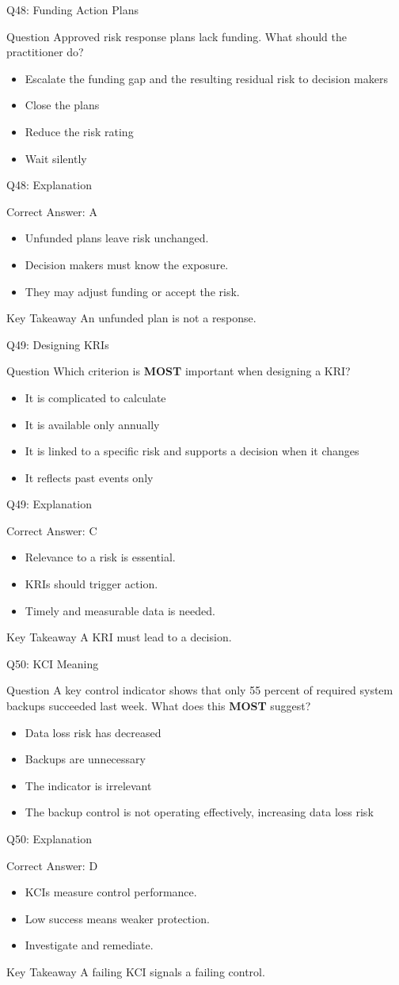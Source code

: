 \documentclass[aspectratio=169]{beamer}
\newcommand{\hq}[7]{%
	\begin{frame}{Q#1: #2}
		\begin{block}{Question}
			#3
		\end{block}
		\begin{itemize}
			#4
		\end{itemize}
	\end{frame}
	\begin{frame}{Q#1: Explanation}
		\begin{block}{Correct Answer: #5}
			\begin{itemize}
				#6
			\end{itemize}
		\end{block}
		\begin{alertblock}{Key Takeaway}
			#7
		\end{alertblock}
	\end{frame}
}
\begin{document}
	\hq{48}{Funding Action Plans}
	{Approved risk response plans lack funding. What should the practitioner do?}
	{\item[\textbf{(A)}] Escalate the funding gap and the resulting residual risk to decision makers
		\item[\textbf{(B)}] Close the plans
		\item[\textbf{(C)}] Reduce the risk rating
		\item[\textbf{(D)}] Wait silently}
	{A}
	{\item Unfunded plans leave risk unchanged.
		\item Decision makers must know the exposure.
		\item They may adjust funding or accept the risk.}
	{An unfunded plan is not a response.}
	
	\hq{49}{Designing KRIs}
	{Which criterion is \textbf{MOST} important when designing a KRI?}
	{\item[\textbf{(A)}] It is complicated to calculate
		\item[\textbf{(B)}] It is available only annually
		\item[\textbf{(C)}] It is linked to a specific risk and supports a decision when it changes
		\item[\textbf{(D)}] It reflects past events only}
	{C}
	{\item Relevance to a risk is essential.
		\item KRIs should trigger action.
		\item Timely and measurable data is needed.}
	{A KRI must lead to a decision.}
	
	\hq{50}{KCI Meaning}
	{A key control indicator shows that only 55 percent of required system backups succeeded last week. What does this \textbf{MOST} suggest?}
	{\item[\textbf{(A)}] Data loss risk has decreased
		\item[\textbf{(B)}] Backups are unnecessary
		\item[\textbf{(C)}] The indicator is irrelevant
		\item[\textbf{(D)}] The backup control is not operating effectively, increasing data loss risk}
	{D}
	{\item KCIs measure control performance.
		\item Low success means weaker protection.
		\item Investigate and remediate.}
	{A failing KCI signals a failing control.}
	
\end{document}
